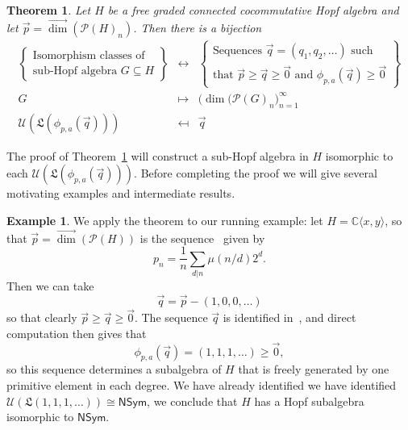 \documentclass[11pt]{amsart}
\newtheorem{thm}{Theorem}
\theoremstyle{definition}
\newtheorem{example}[theorem]{Example}
\numberwithin{equation}{section}
\def\CC{{\mathbb C}}
\newcommand{\lucas}[1]{\todo[size=\tiny,color=red!50]{#1 \\ \hfill --- Lucas}}
\begin{document}
\begin{thm}
\label{thm:subclassification2}
Let $H$ be a free graded connected cocommutative Hopf algebra and let $\vec{p} = \vec{\dim}(\mathcal{P}(H)_{n})$.  Then there is a bijection
\[
\begin{array}{rcl}
\left\{\begin{array}{c}
\text{Isomorphism classes of} \\
\text{sub-Hopf algebra $G \subseteq H$}
\end{array}\right\}
& \leftrightarrow & 
\left\{\begin{array}{c}
\text{Sequences $\vec{q} = (q_{1}, q_{2}, \ldots)$ such } \\
\text{that $\vec{p} \ge \vec{q} \ge \vec{0}$ and $\phi_{p, a}(\vec{q}) \ge \vec{0}$} 
\end{array}\right\} \\[2em]
G & \mapsto & \big(\dim(\mathcal{P}(G)_{n} \big)_{n = 1}^{\infty} \\
\mathcal{U}(\mathfrak{L}(\phi_{p, a}(\vec{q}))) & \mapsfrom & \vec{q}
\end{array}
\]
\end{thm}

The proof of Theorem~\ref{thm:subclassification2} will construct a sub-Hopf algebra in $H$ isomorphic to each $\mathcal{U}(\mathfrak{L}(\phi_{p, a}(\vec{q})))$.  
Before completing the proof we will give several motivating examples and intermediate results.

\begin{example}
\label{ex:NSymInCxy}
We apply the theorem to our running example: let $H = \CC\langle x, y \rangle$, so that $\vec{p} = \vec{\dim}(\mathcal{P}(H))$ is the sequence~\cite[A001037]{OEIS} given by 
\[
p_{n} = \frac{1}{n} \sum_{d | n} \mu(n/d) 2^{d}.
\]
Then we can take 
\[
\vec{q} = \vec{p} - (1, 0, 0, \ldots)
\]
so that clearly $\vec{p} \ge \vec{q} \ge \vec{0}$.  
The sequence $\vec{q}$ is identified in~\cite[A059966]{OEIS}, and direct computation then gives that
\[
\phi_{p, a}(\vec{q}) = (1, 1, 1, \ldots) \ge \vec{0},
\]
so this sequence determines a subalgebra of $H$ that is freely generated by one primitive element in each degree. 
We have already\lucas{pretend that we have} identified we have identified $\mathcal{U}(\mathfrak{L}(1, 1, 1, \ldots)) \cong \mathsf{NSym}$, we conclude that $H$ has a Hopf subalgebra isomorphic to $\mathsf{NSym}$.
\end{example}
\end{document}
